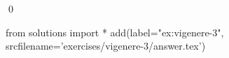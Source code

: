 
\begin{ex} 
  \label{ex:vigenere-3}
  
  \qed
\end{ex} 
\begin{python0}
from solutions import *
add(label="ex:vigenere-3",
    srcfilename='exercises/vigenere-3/answer.tex') 
\end{python0}
